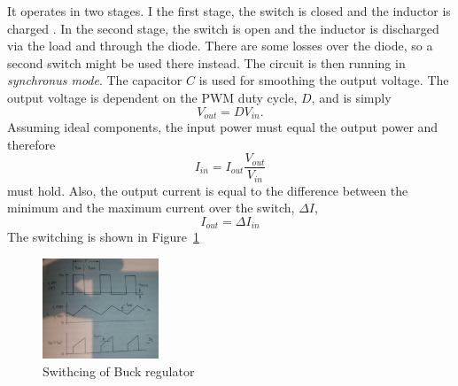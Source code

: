 It operates in two stages. I the first stage, the
switch is closed and the inductor is charged . In the second stage, the switch
is open and the inductor is discharged via the load and through the diode. There
are some losses over the diode, so a second switch might be used there instead.
The circuit is then running in \textit{synchronus mode}. The capacitor $C$ is
used for smoothing the output voltage. The output voltage is dependent on the
PWM duty cycle, $D$, and is simply
\begin{equation}
    V_{out} = DV_{in}.
\end{equation}
Assuming ideal components, the input power must equal the output power and
therefore
\begin{equation}
    I_{in} = I_{out}\frac {V_{out}} {V_{in}}
\end{equation}
must hold. Also, the output current is equal to the difference between the
minimum and the maximum current over the switch, $\Delta I$, 
\begin{equation}
    I_{out} = \Delta I_{in}
\end{equation}
The switching is shown in Figure~\ref{fig:buckswitch}
\begin{figure}[H]
    \centering
    \includegraphics[height=3cm]{./lec2/buckswitch.jpg}
    \caption{Swithcing of Buck regulator}
    \label{fig:buckswitch}
\end{figure}

